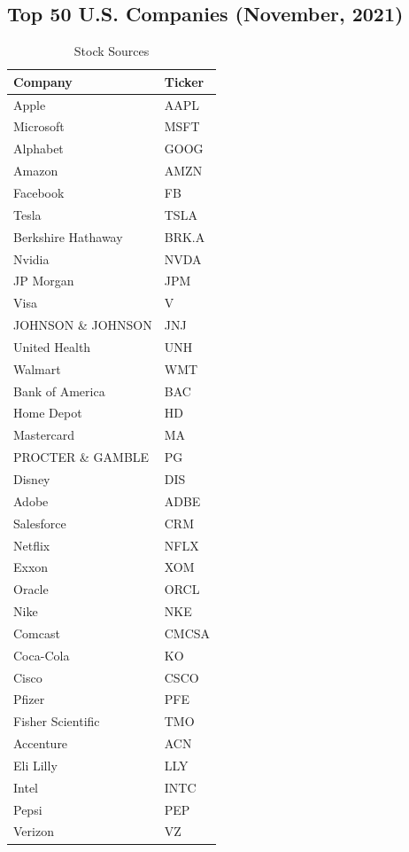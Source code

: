 \documentclass[conference]{IEEEtran}
\begin{document}
\begin{singlespace}
\subsection{Top 50 U.S. Companies (November, 2021)}
\label{top50}
\begin{table}[H]
    \caption{Stock Sources}
    \centering
\begin{tabular}{|l|l|}
    \hline
    \textbf{Company} & \textbf{Ticker} \\
    \hline
    Apple & AAPL \\
    Microsoft & MSFT \\
    Alphabet & GOOG \\
    Amazon & AMZN \\
    Facebook & FB \\
    Tesla & TSLA \\
    Berkshire Hathaway & BRK.A \\
    Nvidia & NVDA \\
    JP Morgan & JPM \\
    Visa & V \\
    JOHNSON \& JOHNSON & JNJ \\
    United Health & UNH \\
    Walmart & WMT \\
    Bank of America & BAC \\
    Home Depot & HD \\
    Mastercard & MA \\
    PROCTER \& GAMBLE & PG \\
    Disney & DIS \\
    Adobe & ADBE \\
    Salesforce & CRM \\
    Netflix & NFLX \\
    Exxon & XOM \\
    Oracle & ORCL \\
    Nike & NKE \\
    Comcast & CMCSA \\
    Coca-Cola & KO \\
    Cisco & CSCO \\
    Pfizer & PFE \\
    Fisher Scientific & TMO \\
    Accenture & ACN \\
    Eli Lilly & LLY \\
    Intel & INTC \\
    Pepsi & PEP \\
    Verizon & VZ \\

\end{tabular}
\end{table}
\end{singlespace}
\end{document}
